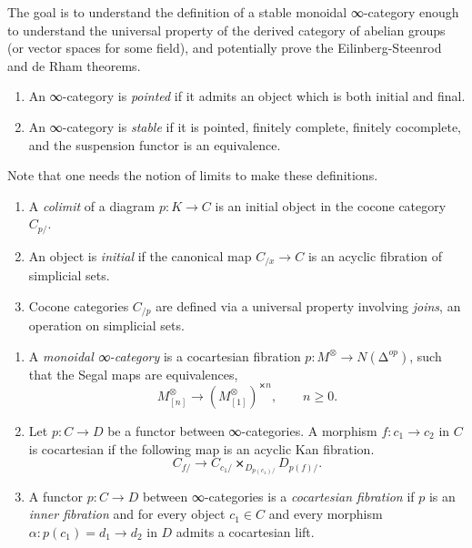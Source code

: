 \documentclass{article}
\theoremstyle{definition}
\begin{document}
\bigskip



The goal is to understand the definition of a stable monoidal ∞-category enough to understand the universal property of the derived category of abelian groups (or vector spaces for some field), and potentially prove the Eilinberg-Steenrod and de Rham theorems.

\begin{enumerate}
 \item An ∞-category is \emph{pointed} if it admits an object which is both initial and final.
 \item An ∞-category is \emph{stable} if it is pointed, finitely complete, finitely cocomplete, and the suspension functor is an equivalence.
\end{enumerate}

Note that one needs the notion of limits to make these definitions.

\begin{enumerate}
 \item A \emph{colimit} of a diagram $p: K \to C$ is an initial object in the cocone category $C_{p/}$.
 \item An object is \emph{initial} if the canonical map $C_{/x} \to C$ is an acyclic fibration of simplicial sets.
 \item Cocone categories $C_{/p}$ are defined via a universal property involving \emph{joins}, an operation on simplicial sets.
\end{enumerate}

\begin{enumerate}
 \item A \emph{monoidal ∞-category} is a cocartesian fibration $p: M^⊗ → N(∆^{op})$, such that the Segal maps are equivalences, 
 \[ M^⊗_{[n]} \to (M_{[1]}^⊗)^{⨯n}, \qquad n ≥ 0. \]
 
 \item Let $p: C → D$ be a functor between ∞-categories. A morphism $f: c_1 {→} c_2$ in $C$ is cocartesian if the following map is an acyclic Kan fibration.
\[ C_{f/} → C_{c_1/} ⨯_{D_{p(c_1)/}} D_{p(f)/}. \]

 \item A functor $p: C → D$ between ∞-categories is a \emph{cocartesian fibration} if $p$ is an \emph{inner fibration} and for every object $c_1 ∈ C$ and every morphism $α: p(c_1) = d_1 → d_2$ in $D$ admits a cocartesian lift.
\end{enumerate}

















  
\end{document}
